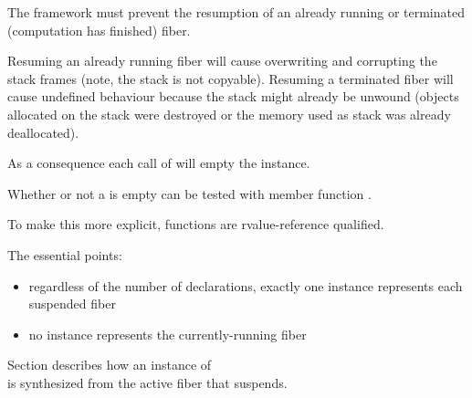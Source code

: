 \label{invalidation}

The framework must prevent the resumption of an already running or terminated
(computation has finished) fiber.

Resuming an already running fiber will cause overwriting and corrupting the stack
frames (note, the stack is not copyable).  Resuming a terminated fiber will
cause undefined behaviour because the stack might already be unwound (objects
allocated on the stack were destroyed or the memory used as stack was already
deallocated).

As a consequence each call of \resume will empty the \fiber instance.

Whether or not a \fiber is empty can be tested with member function \opbool.

To make this more explicit, functions \allresume are rvalue-reference qualified.

The essential points:
\begin{itemize}
    \item regardless of the number of \fiber declarations, exactly one \fiber
          instance represents each suspended fiber
    \item no \fiber instance represents the currently-running fiber
\end{itemize}

Section  describes how an instance of\\
\fiber is synthesized from the active fiber that suspends.

